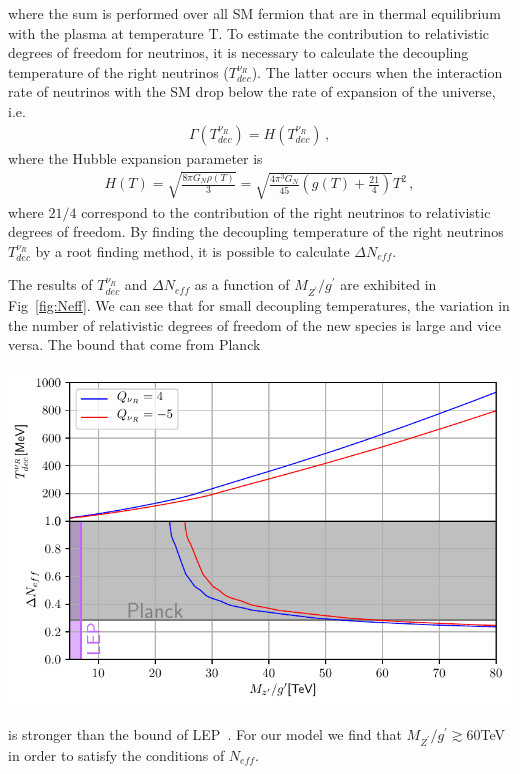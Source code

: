 \documentclass[12pt]{article}
\begin{document}
%
where the sum is performed over all SM fermion that are in thermal equilibrium with the plasma at temperature T. To estimate the contribution to relativistic degrees of freedom for neutrinos, it is necessary to calculate the decoupling temperature of the right neutrinos ($T^{\nu_R}_{dec}$). The latter occurs when the interaction rate of neutrinos with the SM drop below the rate of expansion of the universe, i.e.
%
\begin{align*}
\Gamma(T^{\nu_R}_{dec}) = H(T^{\nu_R}_{dec})\,, 
\end{align*}
%
where the Hubble expansion parameter is
%
\begin{align*}
    H(T) = \sqrt{\frac{8 \pi G_{N} \rho(T)}{3}} = \sqrt{\frac{4 \pi^{3} G_{N}}{45} \left( g(T) + \frac{21}{4} \right)} T^{2}\,,
\end{align*}
%
where $21/4$ correspond to the contribution of the right neutrinos to relativistic degrees of freedom. By finding the decoupling temperature of the right neutrinos $T^{\nu_R}_{dec} $ by a root finding method, it is possible to calculate $\Delta N_{eff}$.

The results of $T^{\nu_R}_{dec}$ and $\Delta N_{eff}$ as a function of $M_{Z^{\prime}}/g^{\prime}$ are exhibited in Fig~\ref{fig:Neff}. We can see that for small decoupling temperatures, the variation in the number of relativistic degrees of freedom of the new species is large and vice versa. The bound that come from Planck~\cite{ghanim:2018eyx}

\includegraphics[scale=0.9]{Figures/DeltaNeff.pdf}

is stronger than the bound of LEP~\cite{Alioli:2017nzr}. For our model we find that $M_{Z^{\prime}}/g^{\prime} \gtrsim 60$TeV in order to satisfy the conditions of $N_{eff}$.

\appendix

%
%
%

%

\end{document}

